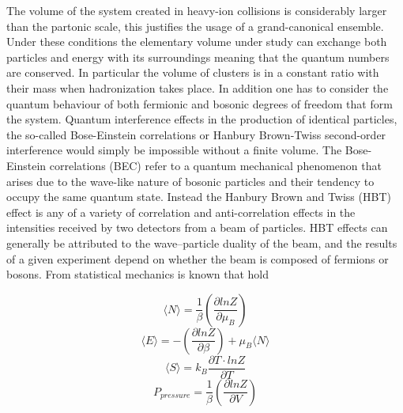 \documentclass[12pt,a4paper]{book}
\begin{document}
	The volume of the system created in	heavy-ion collisions is considerably larger than the partonic scale, this justifies the usage of a grand-canonical ensemble. Under these conditions the elementary volume under study can exchange both particles and energy with its surroundings meaning that the quantum numbers are conserved. In particular the volume of clusters is in a constant ratio with their mass when hadronization takes place.  In addition one has to consider the quantum behaviour of both fermionic and bosonic degrees of freedom that form the system. Quantum interference effects in the production of identical particles, the so-called Bose-Einstein correlations or Hanbury Brown-Twiss second-order interference would simply be impossible without a finite volume. The Bose-Einstein correlations (BEC) refer to a quantum mechanical phenomenon that arises due to the wave-like nature of bosonic particles and their tendency to occupy the same quantum state. Instead the Hanbury Brown and Twiss (HBT) effect is any of a variety of correlation and anti-correlation effects in the intensities received by two detectors from a beam of particles. HBT effects can generally be attributed to the wave–particle duality of the beam, and the results of a given experiment depend on whether the beam is composed of fermions or bosons. From statistical mechanics is known that hold
	
	\begin{equation}
		\langle N \rangle = \frac{1}{\beta} \left( \frac{\partial lnZ}{\partial \mu_B}\right)
		\label{eq:stat_n}
	\end{equation}
	\begin{equation}
		\langle E \rangle = - \left( \frac{\partial lnZ}{\partial \beta}\right) + \mu_B \langle N \rangle 
		\label{eq:stat_energy}
	\end{equation}
	\begin{equation}
		\langle S \rangle = k_B \frac{\partial T \cdot lnZ}{\partial T}
		\label{eq:stat_entropy}
	\end{equation}
	\begin{equation}
		P_{pressure} = \frac{1}{\beta} \left( \frac{\partial lnZ}{\partial V}\right) 
		\label{eq:stat_pressure}
	\end{equation}
	
\end{document}
